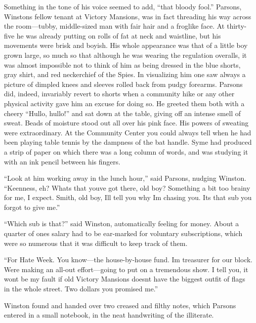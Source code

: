 Something in the tone of his voice seemed to add, ``that bloody fool.''
Parsons, Winston\textquotesingle s fellow tenant at Victory Mansions,
was in fact threading his way across the room---tubby, middle-sized man
with fair hair and a froglike face. At thirty-five he was already
putting on rolls of fat at neck and waistline, but his movements were
brisk and boyish. His whole appearance was that of a little boy grown
large, so much so that although he was wearing the regulation overalls,
it was almost impossible not to think of him as being dressed in the
blue shorts, gray shirt, and red neckerchief of the Spies. In
visualizing him one saw always a picture of dimpled knees and sleeves
rolled back from pudgy forearms. Parsons did, indeed, invariably revert
to shorts when a community hike or any other physical activity gave him
an excuse for doing so. He greeted them both with a cheery ``Hullo,
hullo!'' and sat down at the table, giving off an intense smell of sweat.
Beads of moisture stood out all over his pink face. His powers of
sweating were extraordinary. At the Community Center you could always
tell when he had been playing table tennis by the dampness of the bat
handle. Syme had produced a strip of paper on which there was a long
column of words, and was studying it with an ink pencil between his
fingers.

``Look at him working away in the lunch hour,'' said Parsons, nudging
Winston. ``Keenness, eh? What\textquotesingle s that
you\textquotesingle ve got there, old boy? Something a bit too brainy
for me, I expect. Smith, old boy, I\textquotesingle ll tell you why
I\textquotesingle m chasing you. It\textquotesingle s that sub you
forgot to give me.''

``Which sub is that?'' said Winston, automatically feeling for money.
About a quarter of one\textquotesingle s salary had to be ear-marked for
voluntary subscriptions, which were so numerous that it was difficult to
keep track of them.

``For Hate Week. You know---the house-by-house fund. I\textquotesingle m
treasurer for our block. We\textquotesingle re making an all-out
effort---going to put on a tremendous show. I tell you, it
won\textquotesingle t be my fault if old Victory Mansions
doesn\textquotesingle t have the biggest outfit of flags in the whole
street. Two dollars you promised me.''

Winston found and handed over two creased and filthy notes, which
Parsons entered in a small notebook, in the neat handwriting of the
illiterate.

